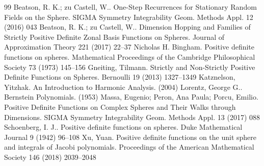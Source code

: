 \documentclass[10pt,a4paper]{amsart}
\begin{document}
\begin{thebibliography}{99}
 Beatson, R. K.; zu Castell, W.. One-Step Recurrences for Stationary Random Fields on the Sphere. SIGMA Symmetry Integrability Geom. Methods Appl. 12 (2016) 043
 Beatson, R. K.; zu Castell, W.. Dimension Hopping and Families of Strictly Positive Definite Zonal Basis Functions on Spheres. Journal of Approximation Theory 221 (2017) 22--37
 Nicholas H. Bingham. Positive definite functions on spheres. Mathematical Proceedings of the Cambridge Philosophical Society 73 (1973) 145--156
 Gneiting, Tilmann. Strictly and Non-Strictly Positive Definite Functions on Spheres. Bernoulli 19 (2013) 1327--1349
 Katznelson, Yitzhak. An Introduction to Harmonic Analysis. (2004)
 Lorentz, George G.. Bernstein Polynomials. (1953)
 Massa, Eugenio; Peron, Ana Paula; Porcu, Emilio. Positive Definite Functions on Complex Spheres and Their Walks through Dimensions. SIGMA Symmetry Integrability Geom. Methods Appl. 13 (2017) 088
 Schoenberg, I. J.. Positive definite functions on spheres. Duke Mathematical Journal 9 (1942) 96--108
 Xu, Yuan. Positive definite functions on the unit sphere and integrals of Jacobi polynomials. Proceedings of the American Mathematical Society 146 (2018) 2039--2048
\end{thebibliography}
\end{document}
